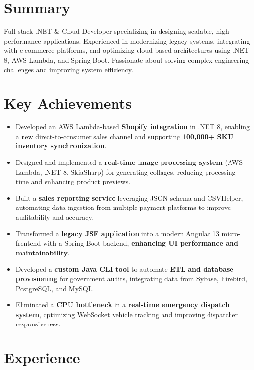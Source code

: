 \documentclass[a4paper,10pt]{article}
\begin{document}
\begin{minipage}[t]{0.65\textwidth}
\sloppy
    \section*{Summary}
    Full-stack .NET \& Cloud Developer specializing in designing scalable, high-performance applications. Experienced in modernizing legacy systems, integrating with e-commerce platforms, and optimizing cloud-based architectures using .NET 8, AWS Lambda, and Spring Boot. Passionate about solving complex engineering challenges and improving system efficiency.
    
    \vspace{4mm}
    \section*{Key Achievements}
    \begin{itemize}
        \item Developed an AWS Lambda-based \textbf{Shopify integration} in .NET 8, enabling a new direct-to-consumer sales channel and supporting \textbf{100,000+ SKU inventory synchronization}.
        \item Designed and implemented a \textbf{real-time image processing system} (AWS Lambda, .NET 8, SkiaSharp) for generating collages, reducing processing time and enhancing product previews.
        \item Built a \textbf{sales reporting service} leveraging JSON schema and CSVHelper, automating data ingestion from multiple payment platforms to improve auditability and accuracy.
        \item Transformed a \textbf{legacy JSF application} into a modern Angular 13 micro-frontend with a Spring Boot backend, \textbf{enhancing UI performance and maintainability}.
        \item Developed a \textbf{custom Java CLI tool} to automate \textbf{ETL and database provisioning} for government audits, integrating data from Sybase, Firebird, PostgreSQL, and MySQL.
        \item Eliminated a \textbf{CPU bottleneck} in a \textbf{real-time emergency dispatch system}, optimizing WebSocket vehicle tracking and improving dispatcher responsiveness.
    \end{itemize}
    
    \vspace{4mm}
    \section*{Experience}

\end{minipage}
\end{document}
